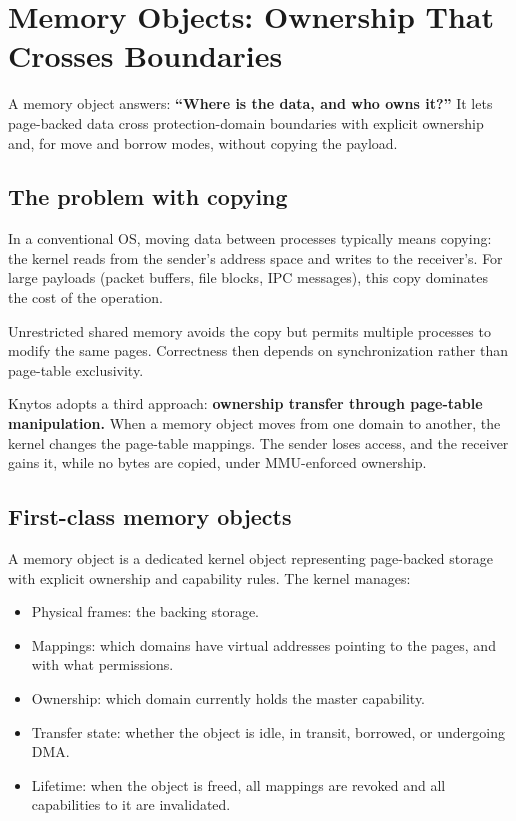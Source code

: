 \chapter{Memory Objects: Ownership That Crosses Boundaries}
\label{chap:memory-objects}

A memory object answers: \textbf{``Where is the data, and who owns it?''} It lets
page-backed data cross protection-domain boundaries with explicit ownership and,
for move and borrow modes, without copying the payload.

\section{The problem with copying}

In a conventional OS, moving data between processes typically means copying:
the kernel reads from the sender's address space and writes to the receiver's.
For large payloads (packet buffers, file blocks, IPC messages), this copy
dominates the cost of the operation.

Unrestricted shared memory avoids the copy but permits multiple processes to modify
the same pages. Correctness then depends on synchronization rather than page-table
exclusivity.

Knytos adopts a third approach: \textbf{ownership transfer through page-table
manipulation.} When a memory object moves from one domain to another, the kernel
changes the page-table mappings. The sender loses access, and the receiver gains it,
while no bytes are copied, under MMU-enforced ownership.

\section{First-class memory objects}

A memory object is a dedicated kernel object representing page-backed storage with
explicit ownership and capability rules. The kernel manages:

\begin{itemize}
    \item Physical frames: the backing storage.
    \item Mappings: which domains have virtual addresses pointing to
        the pages, and with what permissions.
    \item Ownership: which domain currently holds the master
        capability.
    \item Transfer state: whether the object is idle, in transit,
        borrowed, or undergoing DMA.
    \item Lifetime: when the object is freed, all mappings are
        revoked and all capabilities to it are invalidated.
\end{itemize}

